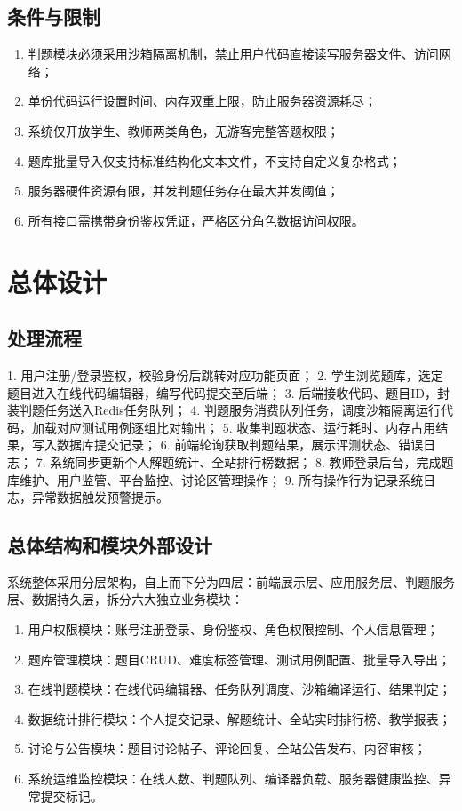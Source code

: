 \documentclass{../template/softeng}
\begin{document}
\subsection{条件与限制}
\begin{enumerate}
    \item 判题模块必须采用沙箱隔离机制，禁止用户代码直接读写服务器文件、访问网络；
    \item 单份代码运行设置时间、内存双重上限，防止服务器资源耗尽；
    \item 系统仅开放学生、教师两类角色，无游客完整答题权限；
    \item 题库批量导入仅支持标准结构化文本文件，不支持自定义复杂格式；
    \item 服务器硬件资源有限，并发判题任务存在最大并发阈值；
    \item 所有接口需携带身份鉴权凭证，严格区分角色数据访问权限。
\end{enumerate}

\section{总体设计}
\subsection{处理流程}
1. 用户注册/登录鉴权，校验身份后跳转对应功能页面；
2. 学生浏览题库，选定题目进入在线代码编辑器，编写代码提交至后端；
3. 后端接收代码、题目ID，封装判题任务送入Redis任务队列；
4. 判题服务消费队列任务，调度沙箱隔离运行代码，加载对应测试用例逐组比对输出；
5. 收集判题状态、运行耗时、内存占用结果，写入数据库提交记录；
6. 前端轮询获取判题结果，展示评测状态、错误日志；
7. 系统同步更新个人解题统计、全站排行榜数据；
8. 教师登录后台，完成题库维护、用户监管、平台监控、讨论区管理操作；
9. 所有操作行为记录系统日志，异常数据触发预警提示。

\subsection{总体结构和模块外部设计}
系统整体采用分层架构，自上而下分为四层：前端展示层、应用服务层、判题服务层、数据持久层，拆分六大独立业务模块：
\begin{enumerate}
    \item 用户权限模块：账号注册登录、身份鉴权、角色权限控制、个人信息管理；
    \item 题库管理模块：题目CRUD、难度标签管理、测试用例配置、批量导入导出；
    \item 在线判题模块：在线代码编辑器、任务队列调度、沙箱编译运行、结果判定；
    \item 数据统计排行模块：个人提交记录、解题统计、全站实时排行榜、教学报表；
    \item 讨论与公告模块：题目讨论帖子、评论回复、全站公告发布、内容审核；
    \item 系统运维监控模块：在线人数、判题队列、编译器负载、服务器健康监控、异常提交标记。
\end{enumerate}
\end{document}
